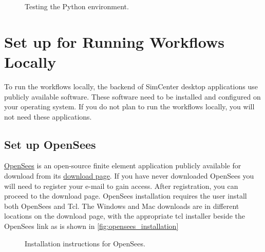 \begin{figure}[!htbp]
  \caption{Testing the Python environment.}
  \label{fig:python_test}
\end{figure}

\section{Set up for Running Workflows Locally}\label{setup}

To run the workflows locally, the backend of SimCenter desktop applications use publicly available software. These software need to be installed and configured on your operating system. If you do not plan to run the workflows locally, you will not need these applications.

\subsection{Set up OpenSees}

\href{https://opensees.berkeley.edu}{OpenSees} is an open-source finite element application publicly available for download from its \href{https://opensees.berkeley.edu/OpenSees/user/download.php}{download page}. If you have never downloaded OpenSees you will need to register your e-mail to gain access. After registration, you can proceed to the download page. OpenSees installation requires the user install both OpenSees and Tcl. The Windows and Mac downloads are in different locations on the download page, with the appropriate tcl installer beside the OpenSees link as is shown in \autoref{fig:opensees_installation}

\begin{figure}[!htbp]
  \caption{Installation instructions for OpenSees.}
  \label{fig:opensees_installation}
\end{figure}

